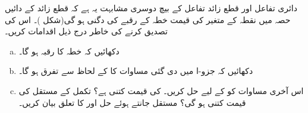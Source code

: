 دائری تفاعل اور قطع  زائد تفاعل کے بیچ دوسری مشابہت یہ ہے کہ قطع زائد  کے دائیں حصہ میں نقطہ  کے متغیر    کی قیمت خطہ  کے رقبے  کی  دگنی ہو گی(شکل )۔ اس کی تصدیق کرنے کی خاطر درج ذیل اقدامات کریں۔
\begin{enumerate}[a.]
\item
دکھائیں کہ خطہ  کا رقبہ  ہو گا۔
\item
دکھائیں کہ جزو-ا میں دی گئی مساوات کا  کے لحاظ سے تفرق  ہو گا۔
\item
اس آخری مساوات کو  کے لیے حل کریں۔  کی قیمت کتنی ہے؟ تکمل کے مستقل  کی قیمت کتنی ہو گی؟ مستقل  جانتے ہوئے حل  اور  کا تعلق بیان کریں۔
\end{enumerate}
